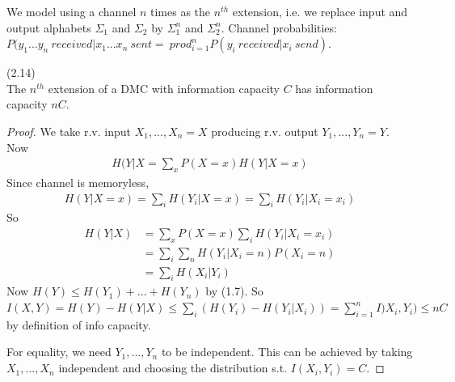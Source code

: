 \documentclass[a4paper]{article}
\begin{document}
We model using a channel $n$ times as the $n^{th}$ extension, i.e. we replace input and output alphabets $\Sigma_1$ and $\Sigma_2$ by $\Sigma_1^n$ and $\Sigma_2^n$. Channel probabilities: $P(y_1...y_n\ received | x_1...x_n\ sent =\ prod_{i=1}^n P(y_i\ received| x_i\ send)$.

\begin{lemma} (2.14)\\
The $n^{th}$ extension of a DMC with information capacity $C$ has information capacity $nC$.
\begin{proof}
We take r.v. input $X_1,...,X_n = X$ producing r.v. output $Y_1,...,Y_n = Y$. Now
\begin{equation*}
\begin{aligned}
H(Y|X = \sum_x P(X=x) H(Y|X=x)
\end{aligned}
\end{equation*}
Since channel is memoryless,
\begin{equation*}
\begin{aligned}
H(Y|X=x) = \sum_i H(Y_i|X=x) = \sum_i H(Y_i|X_i=x_i)
\end{aligned}
\end{equation*}
So
\begin{equation*}
\begin{aligned}
H(Y|X) &= \sum_x P(X=x) \sum_i H(Y_i|X_i = x_i)\\
&= \sum_i \sum_n H(Y_i|X_i = n) P(X_i = n)\\
&= \sum_i H(X_i | Y_i)
\end{aligned}
\end{equation*}
Now $H(Y) \leq H(Y_1)+...+H(Y_n)$ by (1.7). So $I(X,Y) = H(Y)-H(Y|X) \leq \sum_i (H(Y_i)-H(Y_i|X_i)) = \sum_{i=1}^n I)X_i,Y_i) \leq nC$ by definition of info capacity.

For equality, we need $Y_1,...,Y_n$ to be independent. This can be achieved by taking $X_1,...,X_n$ independent and choosing the distribution s.t. $I(X_i,Y_i) = C$.
\end{proof}
\end{lemma}
\end{document}

